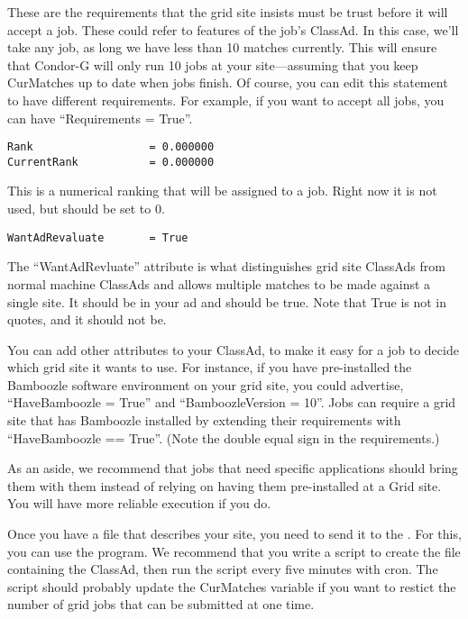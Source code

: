 These are the requirements that the grid site insists must be trust
before it will accept a job. These could refer to features of the
job's ClassAd. In this case, we'll take any job, as long we have less
than 10 matches currently. This will ensure that Condor-G will only
run 10 jobs at your site---assuming that you keep CurMatches up to
date when jobs finish. Of course, you can edit this statement to have
different requirements. For example, if you want to accept all jobs,
you can have ``Requirements = True''. 

\footnotesize
\begin{verbatim}
Rank                  = 0.000000
CurrentRank           = 0.000000
\end{verbatim}
\normalsize

This is a numerical ranking that will be assigned to a job. Right now
it is not used, but should be set to 0. 

\begin{verbatim}
WantAdRevaluate       = True
\end{verbatim}

The ``WantAdRevluate'' attribute is what distinguishes grid site
ClassAds from normal machine ClassAds and allows multiple matches to
be made against a single site. It should be in your ad and should be
true. Note that True is not in quotes, and it should not be.

You can add other attributes to your ClassAd, to make it easy for a
job to decide which grid site it wants to use. For instance, if you
have pre-installed the Bamboozle software environment on your grid
site, you could advertise, ``HaveBamboozle = True'' and
``BamboozleVersion = 10''. Jobs can require a grid site that has
Bamboozle installed by extending their requirements with
``HaveBamboozle == True''. (Note the double equal sign in the
requirements.) 

As an aside, we recommend that jobs that need specific applications
should bring them with them instead of relying on having them
pre-installed at a Grid site. You will have more reliable execution if
you do. 

Once you have a file that describes your site, you need to send it to
the . For this, you can use the 
program. We recommend that you write a script to create the file
containing the ClassAd, then run the script every five minutes with
cron. The script should probably update the CurMatches variable if you
want to restict the number of grid jobs that can be submitted at one
time. 


